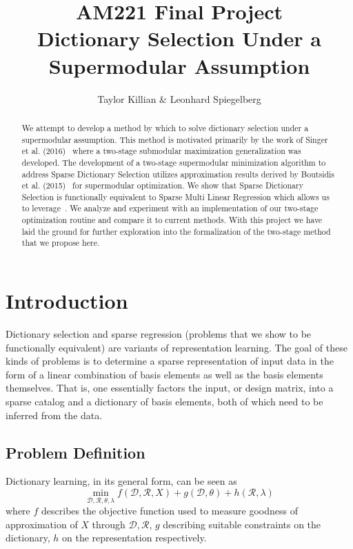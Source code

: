 \documentclass{article}
\newcommand{\Rr}{\mathcal{R}}
\newcommand{\D}{\mathcal{D}}
\begin{document}
\title{AM221 Final Project \\ \large Dictionary Selection Under a Supermodular Assumption}
\author{Taylor Killian \& Leonhard Spiegelberg}
\maketitle

\begin{abstract}
We attempt to develop a method by which to solve dictionary selection under a supermodular assumption. This method is motivated primarily by the work of Singer et al. (2016)~\cite{Singer16TwoStage} where a two-stage submodular maximization generalization was developed. The development of a two-stage supermodular minimization algorithm to address Sparse Dictionary Selection utilizes approximation results derived by Boutsidis et al. (2015)~\cite{weaklyalpha} for supermodular optimization. We show that Sparse Dictionary Selection is functionally equivalent to Sparse Multi Linear Regression which allows us to leverage~\cite{weaklyalpha}. We analyze and experiment with an implementation of our two-stage optimization routine and compare it to current methods. With this project we have laid the ground for further exploration into the formalization of the two-stage method that we propose here.
\end{abstract}

\section{Introduction}\label{sec:intro}

Dictionary selection and sparse regression (problems that we show to be functionally equivalent) are variants of representation learning. The goal of these kinds of problems is to determine a sparse representation of input data in the form of a linear combination of basis elements as well as the basis elements themselves. That is, one essentially factors the input, or design matrix, into a sparse catalog and a dictionary of basis elements, both of which need to be inferred from the data.\\

\subsection{Problem Definition}\label{sec:problem definition}
\noindent Dictionary learning, in its general form, can be seen as
\[
\min_{\D, \Rr, \theta, \lambda} f(\D, \Rr, X) + g(\D, \theta) + h(\Rr, \lambda)
\]
where $f$ describes the objective function used to measure goodness of approximation of $X$ through $\D, \Rr$, $g$ describing suitable constraints on the dictionary, $h$ on the representation respectively.\\
\end{document}
